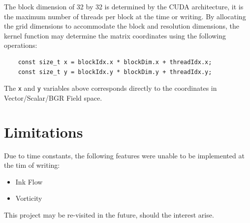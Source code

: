 \documentclass[
10pt, %
letterpaper, %
oneside, %
headinclude,footinclude, %
BCOR5mm, %
]{scrartcl}
\begin{document}
The block dimension of 32 by 32 is determined by the CUDA architecture, it is the maximum number of threads per block at the time or writing.
By allocating the grid dimensions to accommodate the block and resolution dimensions, the kernel function may determine the matrix coordinates
using the following operations:

\begin{verbatim}
    const size_t x = blockIdx.x * blockDim.x + threadIdx.x;
    const size_t y = blockIdx.y * blockDim.y + threadIdx.y;
\end{verbatim}

The \verb|x| and \verb|y| variables above corresponds directly to the coordinates in Vector/Scalar/BGR Field space.

\section{Limitations} %
Due to time constants, the following features were unable to be implemented at the tim of writing:
\begin{itemize}
    \item Ink Flow
    \item Vorticity
\end{itemize}

This project may be re-visited in the future, should the interest arise.
\end{document}
